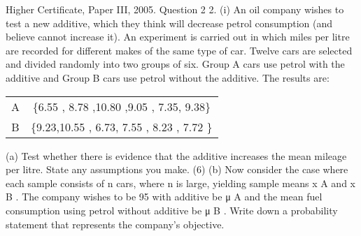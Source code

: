 \documentclass[a4paper,12pt]{article}
\begin{document}
Higher Certificate, Paper III, 2005. Question 2
2.
(i)
An oil company wishes to test a new additive, which they think will decrease
petrol consumption (and believe cannot increase it). An experiment is carried
out in which miles per litre are recorded for different makes of the same type
of car. Twelve cars are selected and divided randomly into two groups of six.
Group A cars use petrol with the additive and Group B cars use petrol without
the additive. The results are:
\begin{center}
\begin{tabular}{|c|c|}
A & \{6.55 ,   8.78 ,10.80 ,9.05 , 7.35, 9.38\} \\

B & \{9.23,10.55 ,  6.73,
7.55 ,
8.23 ,
7.72 \}
\end{tabular}
\end{center}

(a) Test whether there is evidence that the additive increases the mean
mileage per litre. State any assumptions you make.
(6)
(b) Now consider the case where each sample consists of n cars, where n is large, yielding sample means x A and x B . The company wishes to be
95%
with additive be μ A and the mean fuel consumption using petrol without additive be μ B . Write down a probability statement that represents the
company's objective.
\end{document}
